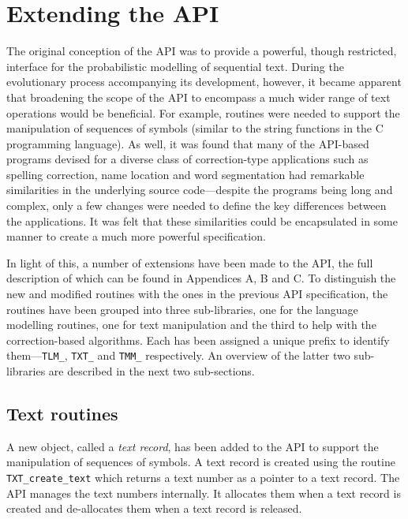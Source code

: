 \documentclass[11pt]{article}
\begin{document}
\section{Extending the API}
\label{section.extensions}

The original conception of the API was to provide a
powerful, though restricted, interface for the probabilistic modelling of sequential text.
During the evolutionary process accompanying its development, however, it became apparent that
broadening the scope of the API to encompass a much wider range of text operations would be
beneficial. For example, routines were needed to support the manipulation
of sequences of symbols (similar to the string functions in the C programming language).
As well, it was found that many of the API-based programs devised for a diverse class of correction-type applications
such as spelling correction, name location and word segmentation
had remarkable similarities in the underlying source code---despite the programs being long and complex,
only a few changes were needed to define the key differences
between the applications. It was felt that these similarities could be encapsulated in some manner
to create a much more powerful specification.

In light of this, a number of extensions have been made to the API, the
full description of which can be found in Appendices A, B and C.
To distinguish the new and modified routines with the ones in the previous API
specification, the routines have been grouped into three sub-libraries, one
for the language modelling routines, one for text manipulation
and the third to help with the correction-based algorithms. Each has been
assigned a unique prefix to identify them---\verb|TLM_|, \verb|TXT_|
and \verb|TMM_| respectively. An overview of the latter two sub-libraries are described
in the next two sub-sections.

\subsection{Text routines}

A new object, called a {\em text record}, has been added to the API to support
the manipulation of sequences of symbols. A text record is created using the routine
\verb|TXT_create_text| which returns a text number as a pointer to a text record.
The API manages the text numbers internally. It allocates them when a text record is created
and de-allocates them when a text record is released.
\end{document}
